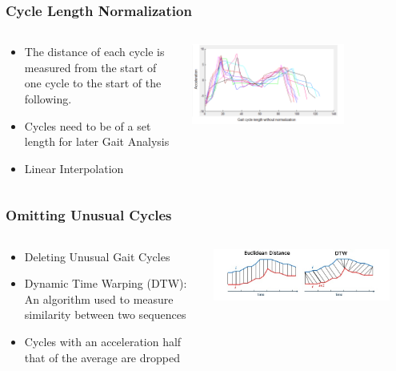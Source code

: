 \documentclass{beamer}
\begin{document}
\begin{frame}
  \frametitle{Cycle Length Normalization}
  \begin{columns}
  \begin{column}{.55\textwidth}
  \begin{itemize}
  	\item The distance of each cycle is measured from the start of one cycle to the start of the following. 
  	\linebreak
  	\item Cycles need to be of a set length for later Gait Analysis
  	\linebreak
  	\item Linear Interpolation 
  \end{itemize}
  \end{column}
    \begin{column}{0.7\textwidth}
   \includegraphics[width=0.7\textwidth]{Illustrations/nonnormalized.png}
       \\
  \end{column}
  \end{columns}
\end{frame}

\begin{frame}
  \frametitle{Omitting Unusual Cycles}
  \begin{columns}
  \begin{column}{.5\textwidth}
  \begin{itemize}
  	\item Deleting Unusual Gait Cycles
  	\linebreak
  	\item Dynamic Time Warping (DTW): An algorithm used to measure similarity between two sequences
  	\linebreak
  	\item Cycles with an acceleration half that of the average are dropped
  \end{itemize}
  \end{column}
    \begin{column}{0.6\textwidth}
   \includegraphics[width=0.9\textwidth]{Illustrations/DTW.jpg}
       \\
  \end{column}
  \end{columns}
\end{frame}
\end{document}
